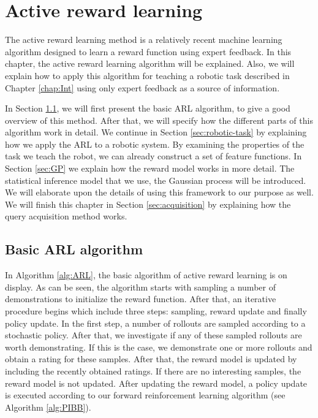 \documentclass[mscThesis.tex]{subfiles}
\begin{document}
\chapter{Active reward learning}
\label{chap:ARL}

The active reward learning method \cite{Daniel2015} is a relatively recent machine learning algorithm designed to learn a reward function using expert feedback. In this chapter, the active reward learning algorithm will be explained. Also, we will explain how to apply this algorithm for teaching a robotic task described in Chapter \ref{chap:Int} using only expert feedback as a source of information. 

In Section \ref{sec:basic-arl}, we will first present the basic ARL algorithm, to give a good overview of this method. After that, we will specify how the different parts of this algorithm work in detail. We continue in Section \ref{sec:robotic-task} by explaining how we apply the ARL to a robotic system. By examining the properties of the task we teach the robot, we can already construct a set of feature functions. In Section \ref{sec:GP} we explain how the reward model works in more detail. The statistical inference model that we use, the Gaussian process will be introduced. We will elaborate upon the details of using this framework to our purpose as well. We will finish this chapter in Section \ref{sec:acquisition} by explaining how the query acquisition method works.

\section{Basic ARL algorithm}
\label{sec:basic-arl}
In Algorithm \ref{alg:ARL}, the basic algorithm of active reward learning is on display. As can be seen, the algorithm starts with sampling a number of demonstrations to initialize the reward function. After that, an iterative procedure begins which include three steps: sampling, reward update and finally policy update. In the first step, a number of rollouts are sampled according to a stochastic policy. After that, we investigate if any of these sampled rollouts are worth demonstrating. If this is the case, we demonstrate one or more rollouts and obtain a rating for these samples. After that, the reward model is updated by including the recently obtained ratings. If there are no interesting samples, the reward model is not updated. After updating the reward model, a policy update is executed according to our forward reinforcement learning algorithm (see Algorithm \ref{alg:PIBB}).
\end{document}

